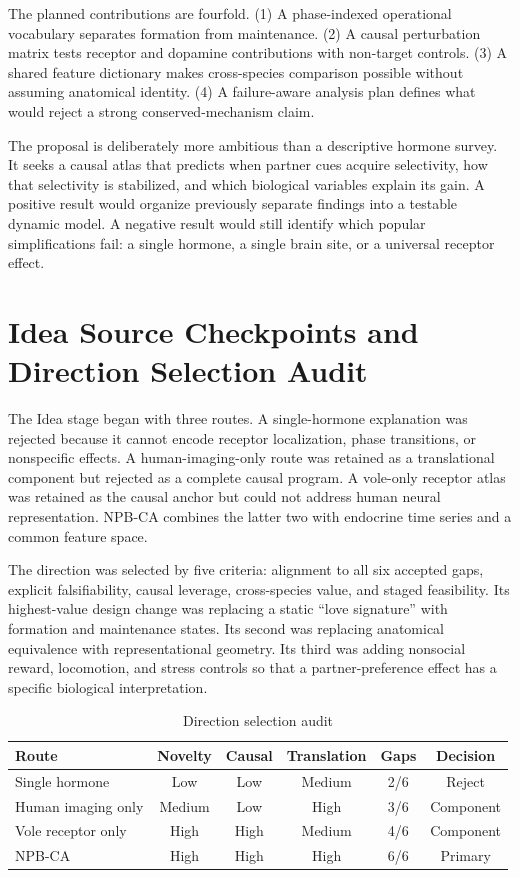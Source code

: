 \documentclass[conference]{IEEEtran}
\begin{document}
The planned contributions are fourfold. (1) A phase-indexed operational vocabulary separates formation from maintenance. (2) A causal perturbation matrix tests receptor and dopamine contributions with non-target controls. (3) A shared feature dictionary makes cross-species comparison possible without assuming anatomical identity. (4) A failure-aware analysis plan defines what would reject a strong conserved-mechanism claim.

The proposal is deliberately more ambitious than a descriptive hormone survey. It seeks a causal atlas that predicts when partner cues acquire selectivity, how that selectivity is stabilized, and which biological variables explain its gain. A positive result would organize previously separate findings into a testable dynamic model. A negative result would still identify which popular simplifications fail: a single hormone, a single brain site, or a universal receptor effect.

\section{Idea Source Checkpoints and Direction Selection Audit}
The Idea stage began with three routes. A single-hormone explanation was rejected because it cannot encode receptor localization, phase transitions, or nonspecific effects. A human-imaging-only route was retained as a translational component but rejected as a complete causal program. A vole-only receptor atlas was retained as the causal anchor but could not address human neural representation. NPB-CA combines the latter two with endocrine time series and a common feature space.

The direction was selected by five criteria: alignment to all six accepted gaps, explicit falsifiability, causal leverage, cross-species value, and staged feasibility. Its highest-value design change was replacing a static ``love signature'' with formation and maintenance states. Its second was replacing anatomical equivalence with representational geometry. Its third was adding nonsocial reward, locomotion, and stress controls so that a partner-preference effect has a specific biological interpretation.

\begin{table}[t]
\caption{Direction selection audit}
\label{tab:audit}
\centering
\small
\begin{tabular}{lccccc}
\toprule
Route & Novelty & Causal & Translation & Gaps & Decision \\
\midrule
Single hormone & Low & Low & Medium & 2/6 & Reject \\
Human imaging only & Medium & Low & High & 3/6 & Component \\
Vole receptor only & High & High & Medium & 4/6 & Component \\
NPB-CA & High & High & High & 6/6 & Primary \\
\bottomrule
\end{tabular}
\end{table}
\end{document}

